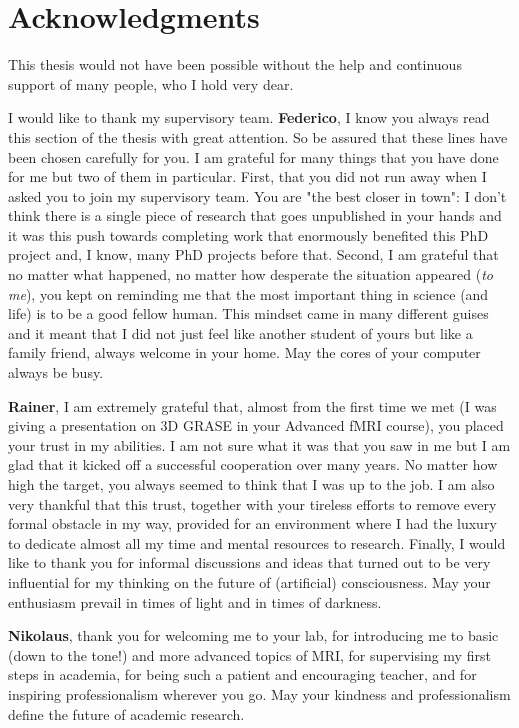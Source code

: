 \chapter{Acknowledgments}
This thesis would not have been possible without the help and continuous support of many people, who I hold very dear.

I would like to thank my supervisory team. \textbf{Federico}, I know you always read this section of the thesis with great attention. So be assured that these lines have been chosen carefully for you. I am grateful for many things that you have done for me but two of them in particular. First, that you did not run away when I asked you to join my supervisory team. You are "the best closer in town": I don't think there is a single piece of research that goes unpublished in your hands and it was this push towards completing work that enormously benefited this PhD project and, I know, many PhD projects before that. Second, I am grateful that no matter what happened, no matter how desperate the situation appeared (\textit{to me}), you kept on reminding me that the most important thing in science (and life) is to be a good fellow human. This mindset came in many different guises and it meant that I did not just feel like another student of yours but like a family friend, always welcome in your home. May the cores of your computer always be busy.

\textbf{Rainer}, I am extremely grateful that, almost from the first time we met (I was giving a presentation on 3D GRASE in your Advanced fMRI course), you placed your trust in my abilities. I am not sure what it was that you saw in me but I am glad that it kicked off a successful cooperation over many years. No matter how high the target, you always seemed to think that I was up to the job. I am also very thankful that  this trust, together with your tireless efforts to remove every formal obstacle in my way, provided for an environment where I had the luxury to dedicate almost all my time and mental resources to research. Finally, I would like to thank you for informal discussions and ideas that turned out to be very influential for my thinking on the future of (artificial) consciousness. May your enthusiasm prevail in times of light and in times of darkness.

\textbf{Nikolaus}, thank you for welcoming me to your lab, for introducing me to basic (down to the tone!) and more advanced topics of MRI, for supervising my first steps in academia, for being such a patient and encouraging teacher, and for inspiring professionalism wherever you go. May your kindness and professionalism define the future of academic research. 


